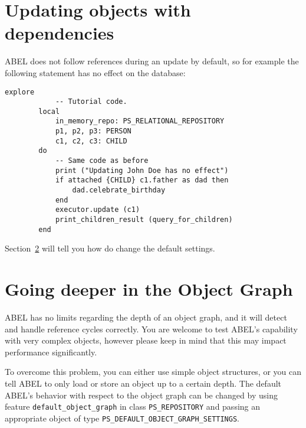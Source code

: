 \documentclass[a4paper,12pt]{report}
\begin{document}
\section{Updating objects with dependencies}
ABEL does not follow references during an update by default, so for example the following statement has no effect on the database:

\begin{lstlisting}[language=OOSC2Eiffel, captionpos=b, caption={References are not followed by default during updates.}, label={lst:reference_update}]
	explore
			-- Tutorial code.
		local
			in_memory_repo: PS_RELATIONAL_REPOSITORY
			p1, p2, p3: PERSON
			c1, c2, c3: CHILD
		do
			-- Same code as before
			print ("Updating John Doe has no effect")
			if attached {CHILD} c1.father as dad then
				dad.celebrate_birthday
			end
			executor.update (c1)
			print_children_result (query_for_children)
		end
\end{lstlisting}
Section~\ref{sec:going_deeper_in_object_graph} will tell you how do change the default settings.
 
\section{Going deeper in the Object Graph}
\label{sec:going_deeper_in_object_graph}
ABEL has no limits regarding the depth of an object graph, and it will detect and handle reference cycles correctly. 
You are welcome to test ABEL's capability with very complex objects, however please keep in mind that this may impact performance significantly.

To overcome this problem, you can either use simple object structures, or you can tell ABEL to only load or store an object up to a certain depth.
The default ABEL's behavior with respect to the object graph can be changed by using feature \lstinline{default_object_graph} in class \lstinline{PS_REPOSITORY} and passing an appropriate object of type \lstinline{PS_DEFAULT_OBJECT_GRAPH_SETTINGS}.
\end{document}
